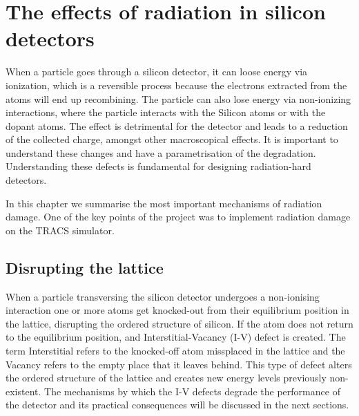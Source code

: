 \chapter{The effects of radiation in silicon detectors}%
\label{sec:rad}

When a particle goes through a silicon detector, it can loose energy via ionization, which is a reversible process because the electrons extracted from the atoms will end up recombining. The particle can also lose energy via non-ionizing interactions, where the particle interacts with the Silicon atoms or with the dopant atoms. The effect is detrimental for the detector and leads to a reduction of the collected charge, amongst other macroscopical effects. It is important to understand these changes and have a parametrisation of the degradation. Understanding these defects is fundamental for designing radiation-hard detectors.

In this chapter we summarise the most important mechanisms of radiation damage. One of the key points of the project was to implement radiation damage on the TRACS simulator.


\section{Disrupting the lattice}%

When a particle transversing the silicon detector undergoes a non-ionising interaction one or more atoms get knocked-out from their equilibrium position in the lattice, disrupting the ordered structure of silicon. If the atom does not return to the equilibrium position, and Interstitial-Vacancy (I-V) defect is created. The term Interstitial refers to the knocked-off atom missplaced in the lattice and the Vacancy refers to the empty place that it leaves behind. This type of defect alters the ordered structure of the lattice and creates new energy levels previously non-existent. The mechanisms by which the I-V defects degrade the performance of the detector and its practical consequences will be discussed in the next sections.


